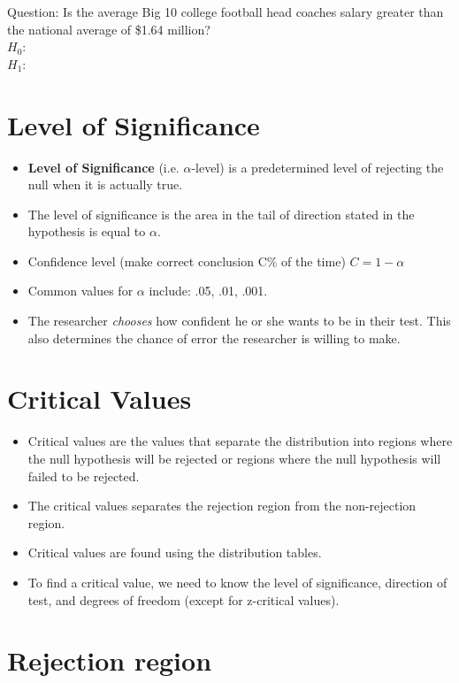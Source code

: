 \documentclass[12pt]{article}
\begin{document}
Question: Is the average Big 10 college football head coaches salary
greater than the national average of \$1.64 million?\\ \(H_{0}:\)\\
\(H_{1}:\)

\section{Level of Significance}\label{level-of-significance}

\begin{itemize}
\itemsep1pt\parskip0pt
\item
  \textbf{Level of Significance} (i.e. \(\alpha\)-level) is a
  predetermined level of rejecting the null when it is actually true.
\item
  The level of significance is the area in the tail of direction stated
  in the hypothesis is equal to \(\alpha\).
\item
  Confidence level (make correct conclusion C\% of the time)
  \(C = 1 - \alpha\)
\item
  Common values for \(\alpha\) include: .05, .01, .001.
\item
  The researcher \emph{chooses} how confident he or she wants to be in
  their test. This also determines the chance of error the researcher is
  willing to make.
\end{itemize}

\section{Critical Values}\label{critical-values}

\begin{itemize}
\itemsep1pt\parskip0pt
\item
  Critical values are the values that separate the distribution into
  regions where the null hypothesis will be rejected or regions where
  the null hypothesis will failed to be rejected.
\item
  The critical values separates the rejection region from the
  non-rejection region.
\item
  Critical values are found using the distribution tables.
\item
  To find a critical value, we need to know the level of significance,
  direction of test, and degrees of freedom (except for z-critical
  values).
\end{itemize}

\section{Rejection region}\label{rejection-region}
\end{document}
